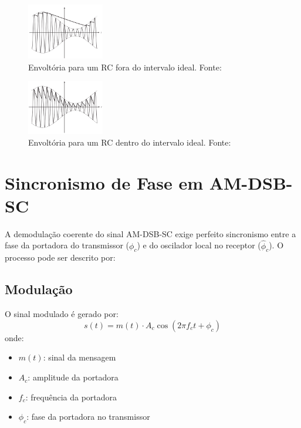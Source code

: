 \begin{figure}[h]
\centering
\includegraphics[width=0.3\textwidth]{images/envoltoria_rc_errado.png}
\caption{Envoltória para um RC fora do intervalo ideal. Fonte: \cite{b13}} 
\label{fig:envoltoria_rc_errado}
\end{figure}

\begin{figure}[h]
\centering
\includegraphics[width=0.3\textwidth]{images/envoltoria_rc_correto.png}
\caption{Envoltória para um RC dentro do intervalo ideal. Fonte: \cite{b13}} 
\label{fig:envoltoria_rc_correto}
\end{figure}



\section{Sincronismo de Fase em AM-DSB-SC}

A demodulação coerente do sinal AM-DSB-SC exige perfeito sincronismo entre a fase da portadora do transmissor ($\phi_c$) e do oscilador local no receptor ($\hat{\phi}_c$). O processo pode ser descrito por:

\subsection{Modulação}
O sinal modulado é gerado por:
\begin{equation}
    s(t) = m(t) \cdot A_c \cos(2\pi f_c t + \phi_c)
\end{equation}
onde:
\begin{itemize}
    \item $m(t)$: sinal da mensagem
    \item $A_c$: amplitude da portadora
    \item $f_c$: frequência da portadora
    \item $\phi_c$: fase da portadora no transmissor
\end{itemize}

